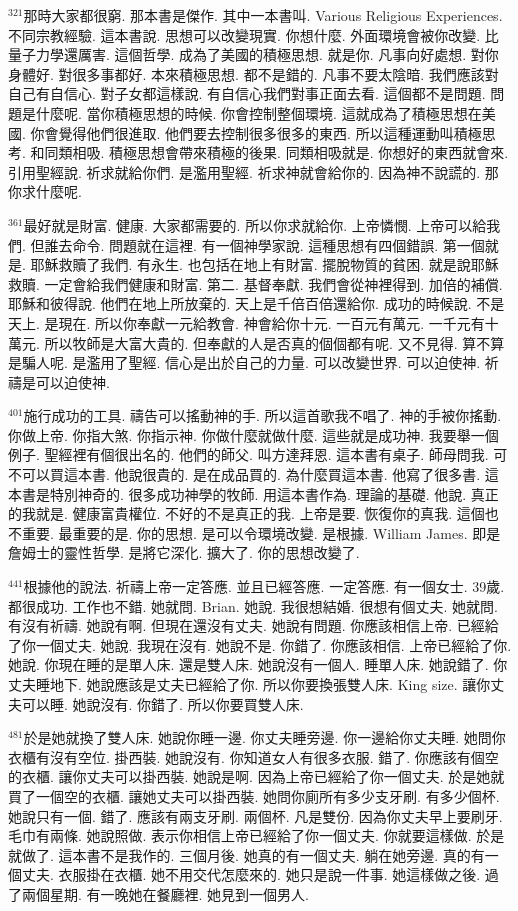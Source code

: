 \documentclass{book}
\begin{document}
$^{321}$那時大家都很窮.
那本書是傑作.
其中一本書叫.
Various Religious Experiences.
不同宗教經驗.
這本書說.
思想可以改變現實.
你想什麼.
外面環境會被你改變.
比量子力學還厲害.
這個哲學.
成為了美國的積極思想.
就是你.
凡事向好處想.
對你身體好.
對很多事都好.
本來積極思想.
都不是錯的.
凡事不要太陰暗.
我們應該對自己有自信心.
對子女都這樣說.
有自信心我們對事正面去看.
這個都不是問題.
問題是什麼呢.
當你積極思想的時候.
你會控制整個環境.
這就成為了積極思想在美國.
你會覺得他們很進取.
他們要去控制很多很多的東西.
所以這種運動叫積極思考.
和同類相吸.
積極思想會帶來積極的後果.
同類相吸就是.
你想好的東西就會來.
引用聖經說.
祈求就給你們.
是濫用聖經.
祈求神就會給你的.
因為神不說謊的.
那你求什麼呢.

$^{361}$最好就是財富.
健康.
大家都需要的.
所以你求就給你.
上帝憐憫.
上帝可以給我們.
但誰去命令.
問題就在這裡.
有一個神學家說.
這種思想有四個錯誤.
第一個就是.
耶穌救贖了我們.
有永生.
也包括在地上有財富.
擺脫物質的貧困.
就是說耶穌救贖.
一定會給我們健康和財富.
第二.
基督奉獻.
我們會從神裡得到.
加倍的補償.
耶穌和彼得說.
他們在地上所放棄的.
天上是千倍百倍還給你.
成功的時候說.
不是天上.
是現在.
所以你奉獻一元給教會.
神會給你十元.
一百元有萬元.
一千元有十萬元.
所以牧師是大富大貴的.
但奉獻的人是否真的個個都有呢.
又不見得.
算不算是騙人呢.
是濫用了聖經.
信心是出於自己的力量.
可以改變世界.
可以迫使神.
祈禱是可以迫使神.

$^{401}$施行成功的工具.
禱告可以搖動神的手.
所以這首歌我不唱了.
神的手被你搖動.
你做上帝.
你指大煞.
你指示神.
你做什麼就做什麼.
這些就是成功神.
我要舉一個例子.
聖經裡有個很出名的.
他們的師父.
叫方達拜恩.
這本書有桌子.
師母問我.
可不可以買這本書.
他說很貴的.
是在成品買的.
為什麼買這本書.
他寫了很多書.
這本書是特別神奇的.
很多成功神學的牧師.
用這本書作為.
理論的基礎.
他說.
真正的我就是.
健康富貴權位.
不好的不是真正的我.
上帝是要.
恢復你的真我.
這個也不重要.
最重要的是.
你的思想.
是可以令環境改變.
是根據.
William James.
即是詹姆士的靈性哲學.
是將它深化.
擴大了.
你的思想改變了.

$^{441}$根據他的說法.
祈禱上帝一定答應.
並且已經答應.
一定答應.
有一個女士.
39歲.
都很成功.
工作也不錯.
她就問.
Brian.
她說.
我很想結婚.
很想有個丈夫.
她就問.
有沒有祈禱.
她說有啊.
但現在還沒有丈夫.
她說有問題.
你應該相信上帝.
已經給了你一個丈夫.
她說.
我現在沒有.
她說不是.
你錯了.
你應該相信.
上帝已經給了你.
她說.
你現在睡的是單人床.
還是雙人床.
她說沒有一個人.
睡單人床.
她說錯了.
你丈夫睡地下.
她說應該是丈夫已經給了你.
所以你要換張雙人床.
King size.
讓你丈夫可以睡.
她說沒有.
你錯了.
所以你要買雙人床.

$^{481}$於是她就換了雙人床.
她說你睡一邊.
你丈夫睡旁邊.
你一邊給你丈夫睡.
她問你衣櫃有沒有空位.
掛西裝.
她說沒有.
你知道女人有很多衣服.
錯了.
你應該有個空的衣櫃.
讓你丈夫可以掛西裝.
她說是啊.
因為上帝已經給了你一個丈夫.
於是她就買了一個空的衣櫃.
讓她丈夫可以掛西裝.
她問你廁所有多少支牙刷.
有多少個杯.
她說只有一個.
錯了.
應該有兩支牙刷.
兩個杯.
凡是雙份.
因為你丈夫早上要刷牙.
毛巾有兩條.
她說照做.
表示你相信上帝已經給了你一個丈夫.
你就要這樣做.
於是就做了.
這本書不是我作的.
三個月後.
她真的有一個丈夫.
躺在她旁邊.
真的有一個丈夫.
衣服掛在衣櫃.
她不用交代怎麼來的.
她只是說一件事.
她這樣做之後.
過了兩個星期.
有一晚她在餐廳裡.
她見到一個男人.
\end{document}
